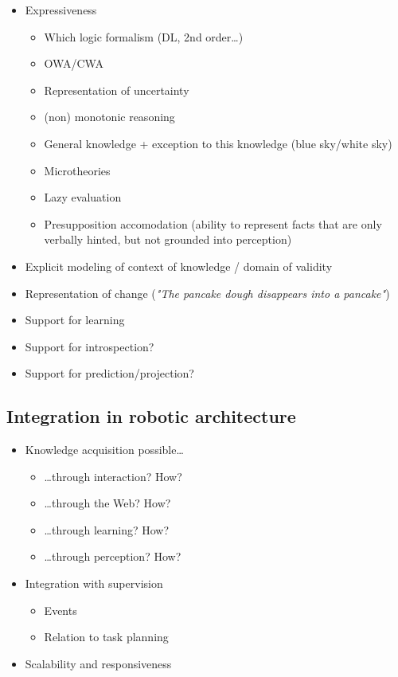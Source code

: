 \documentclass[twocolumn,a4paper]{article}
\begin{document}
\begin{itemize}
	\item  Expressiveness
	\begin{itemize}
		\item  Which logic formalism (DL, 2nd order\ldots{})
		\item  OWA/CWA
		\item  Representation of uncertainty
		\item  (non) monotonic reasoning
		\item  General knowledge + exception to this knowledge (blue sky/white sky)
		\item  Microtheories
		\item  Lazy evaluation
		\item  Presupposition accomodation (ability to represent facts that are only verbally hinted, but not grounded into perception)
	\end{itemize}

	\item  Explicit modeling of context of knowledge / domain of validity
	\item  Representation of change (\emph{"The pancake dough disappears into a pancake"})
	\item  Support for learning
	\item  Support for introspection?
	\item  Support for prediction/projection?
\end{itemize}

\subsection{Integration in robotic architecture}

\begin{itemize}
	\item  Knowledge acquisition possible\ldots{}
	\begin{itemize}
		\item  \ldots{}through interaction? How?
		\item  \ldots{}through the Web? How?
		\item  \ldots{}through learning? How?
		\item  \ldots{}through perception? How?
	\end{itemize}

	\item  Integration with supervision
	\begin{itemize}
		\item  Events
		\item  Relation to task planning
	\end{itemize}

	\item  Scalability and responsiveness
\end{itemize}
\end{document}

